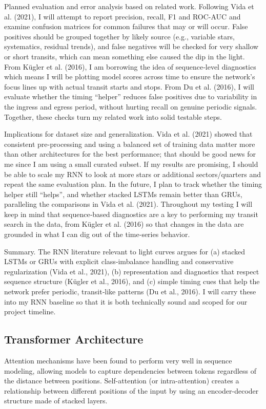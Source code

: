 \documentclass[letterpaper]{article} %
\begin{document}
Planned evaluation and error analysis based on related work. Following Vida et al. (2021), I will attempt to report precision, recall, F1 and ROC-AUC and examine confusion matrices for common failures that may or will occur. False positives should be grouped together by likely source (e.g., variable stars, systematics, residual trends), and false negatives will be checked for very shallow or short transits, which can mean something else caused the dip in the light. From Kügler et al. (2016), I am borrowing the idea of sequence‑level diagnostics which means I will be plotting model scores across time to ensure the network’s focus lines up with actual transit starts and stops. From Du et al. (2016), I will evaluate whether the timing “helper” reduces false positives due to variability in the ingress and egress period, without hurting recall on genuine periodic signals. Together, these checks turn my related work into solid testable steps.

Implications for dataset size and generalization. Vida et al. (2021) showed that consistent pre-processing and using a balanced set of training data matter more than other architectures for the best performance; that should be good news for me since I am using a small curated subset. If my results are promising, I should be able to scale my RNN to look at more stars or additional sectors/quarters and repeat the same evaluation plan. In the future, I plan to track whether the timing helper still “helps”, and whether stacked LSTMs remain better than GRUs, paralleling the comparisons in Vida et al. (2021). Throughout my testing I will keep in mind that sequence‑based diagnostics are a key to performing my transit search in the data, from Kügler et al. (2016) so that changes in the data are grounded in what I can dig out of the time‑series behavior.

Summary. The RNN literature relevant to light curves argues for (a) stacked LSTMs or GRUs with explicit class‑imbalance handling and conservative regularization (Vida et al., 2021), (b) representation and diagnostics that respect sequence structure (Kügler et al., 2016), and (c) simple timing cues that help the network prefer periodic, transit‑like patterns (Du et al., 2016). I will carry these into my RNN baseline so that it is both technically sound and scoped for our project timeline.

\subsection{Transformer Architecture}
Attention mechanisms have been found to perform very well in sequence modeling, allowing models to capture dependencies between tokens regardless of the distance between positions. Self-attention (or intra-attention) creates a relationship between different positions of the input by using an encoder-decoder structure made of stacked layers.
\end{document}
